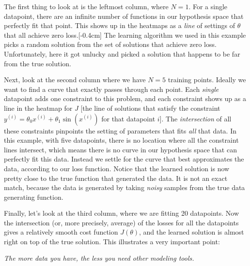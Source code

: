 The first thing to look at is the leftmost column, where $N=1$. For a single datapoint, there are an infinite number of functions in our hypothesis space that perfectly fit that point. This shows up in the heatmaps as a \textit{line} of settings of $\theta$ that all achieve zero loss.[-0.4cm] The learning algorithm we used in this example picks a random solution from the set of solutions that achieve zero loss. Unfortunately, here it got unlucky and picked a solution that happens to be far from the true solution.

Next, look at the second column where we have $N=5$ training points. Ideally we want to find a curve that exactly passes through each point. Each \textit{single} datapoint adds one constraint to this problem, and each constraint shows up as a line in the heatmap for $J$ [the line of solutions that satisfy the constraint $y^{(i)} = \theta_0 x^{(i)} + \theta_1 \sin(x^{(i)})$ for that datapoint $i$]. The \textit{intersection} of all these constraints pinpoints the setting of parameters that fits \textit{all} that data. In this example, with five datapoints, there is no location where all the constraint lines intersect, which means there is no curve in our hypothesis space that can perfectly fit this data. Instead we settle for the curve that best approximates the data, according to our loss function. Notice that the learned solution is now pretty close to the true function that generated the data. It is not an exact match, because the data is generated by taking \textit{noisy} samples from the true data generating function.

Finally, let's look at the third column, where we are fitting 20 datapoints. Now the intersection (or, more precisely, average) of the losses for all the datapoints gives a relatively smooth cost function $J(\theta)$, and the learned solution is almost right on top of the true solution. This illustrates a very important point:
\begin{center}
    \textit{The more data you have, the less you need other modeling tools.}
\end{center}%


